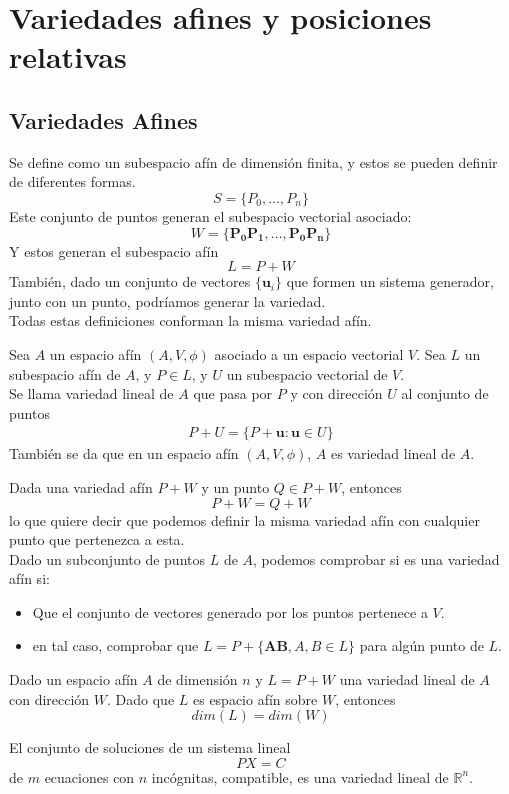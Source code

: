 \documentclass{./Geometria.tex}
\begin{document}
\chapter{Variedades afines y posiciones relativas}
\section{Variedades Afines}
Se define como un subespacio afín de dimensión finita, y estos se pueden definir de diferentes formas.
\[
	S= \{ P_0, \dots , P_{n} \}
\]
Este conjunto de puntos generan el subespacio vectorial asociado:
\[
	W=\{ \mathbf{P_0P_1},\dots ,\mathbf{P_0P_{n}} \}
\]
Y estos generan el subespacio afín
\[
	L=P+W
\]
También, dado un conjunto de vectores $\{ \mathbf{u}_{i} \}$  que formen un sistema generador, junto con un punto, podríamos generar la variedad.\\
Todas estas definiciones conforman la misma variedad afín.
\begin{defin}

	Sea $A$ un espacio afín $(A, V, \phi)$ asociado a un espacio vectorial $V$. Sea $L$ un subespacio afín de $A$, y $P \in L$, y $U$ un subespacio vectorial de $V$.\\
	Se llama variedad lineal de $A$ que pasa por $P$ y con dirección $U$ al conjunto de puntos
	\begin{equation}
		\begin{split}
			P+U=\{ P+\mathbf{u}: \mathbf{u} \in U \}
		\end{split}
	\end{equation}
También se da que en un espacio afín $(A,V,\phi)$, $A$ es variedad lineal de $A$.   
\end{defin}
Dada una variedad afín $P+W$ y un punto $Q\in P+W$, entonces
\[
	P+W=Q+W
\]
lo que quiere decir que podemos definir la misma variedad afín con cualquier punto que pertenezca a esta.\\
Dado un subconjunto de puntos $L$ de $A$, podemos comprobar si es una variedad afín si:
\begin{itemize}
	\item Que el conjunto de vectores generado por los puntos pertenece a $V$.
	\item en tal caso, comprobar que $L=P+\{ \mathbf{AB}, A, B \in L \}$ para algún punto de $L$.  
\end{itemize}
\begin{defin}

	Dado un espacio afín $A$ de dimensión $n$ y $L=P+W$ una variedad lineal de $A$ con dirección $W$. Dado que $L$ es espacio afín sobre $W$, entonces
	\[
		dim(L)=dim(W)
	\]

\end{defin}
El conjunto de soluciones de un sistema lineal
\[
	PX=C
\] 
de $m$ ecuaciones con $n$ incógnitas, compatible, es una variedad lineal de $\mathbb{R} ^{n}$.
\end{document}
